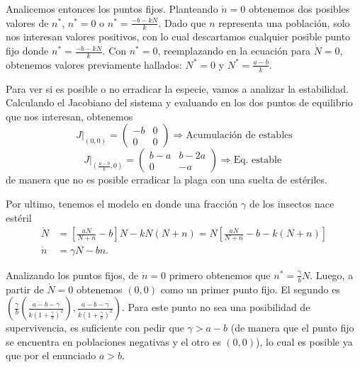 Analicemos entonces los puntos fijos. Planteando $\dot{n} = 0$ obtenemos dos posibles valores de $n^*$, $n^*=0$ o $n^*=\frac{-b-kN}{k}$. Dado que $n$ representa una población, solo nos interesan valores positivos, con lo cual descartamos cualquier posible punto fijo donde $n^*=\frac{-b-kN}{k}$. Con $n^*=0$, reemplazando en la ecuación para $\dot{N}=0$, obtenemos valores previamente hallados: $N^*=0$ y $N^*=\frac{a-b}{k}$.

Para ver si es posible o no erradicar la especie, vamos a analizar la estabilidad. Calculando el Jacobiano del sistema y evaluando en los dos puntos de equilibrio que nos interesan, obtenemos
\begin{equation}
J |_{\left(0,0\right)}=
\begin{pmatrix}
    -b   & 0 \\[6pt]
    0   & 0
\end{pmatrix}
\Rightarrow \text{Acumulación de estables} 
\end{equation}
\begin{equation}
J |_{\left(\frac{a-b}{k},0\right)} =
\begin{pmatrix}
    b-a  & b-2a \\[6pt]
    0   & -a 
\end{pmatrix}
\Rightarrow \text{Eq. estable }
\end{equation}
de manera que no es posible erradicar la plaga con una suelta de estériles.

Por ultimo, tenemos el modelo en donde una fracción $\gamma$ de los insectos nace estéril
\begin{align}
    \dot{N} &= \left[\frac{aN}{N+n} - b\right]N - kN\left(N+n\right) = N \left[ \frac{aN}{N+n} - b - k\left(N+n\right)\right]\\[5pt]
    \dot{n} &= \gamma N -bn.
\end{align}

Analizando los puntos fijos, de $\dot{n}=0$ primero obtenemos que $n^* = \frac{\gamma}{b}N$. Luego, a partir de $\dot{N}=0$ obtenemos $\left(0,0\right)$ como un primer punto fijo. El segundo es $\left(\frac{\gamma}{b}\left(\frac{a-b-\gamma}{k\left(1+\frac{\gamma}{b}\right)^2}\right), \frac{a-b-\gamma}{k\left(1+\frac{\gamma}{b}\right)^2}\right)$. Para este punto no sea una posibilidad de supervivencia, es suficiente con pedir que $\gamma > a-b$ (de manera que el punto fijo se encuentra en poblaciones negativas y el otro es $\left(0,0\right)$), lo cual es posible ya que por el enunciado $a>b$.